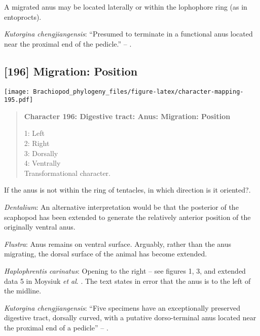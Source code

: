 \documentclass[openany]{book}
\theoremstyle{definition}
\theoremstyle{definition}
\theoremstyle{definition}
\theoremstyle{remark}
\begin{document}
A migrated anus may be located laterally or within the lophophore ring
(as in entoprocts).

\hypertarget{Kutorgina_chengjiangensis-coding-195}{}
\emph{Kutorgina chengjiangensis}: ``Presumed to terminate in a
functional anus located near the proximal end of the pedicle.'' --
\citet{Zhang2007Rhynchonelliformeanbrachiopods}.

\subsection*{{[}196{]} Migration: Position}\label{migration-position}

\texttt{[image: Brachiopod\_phylogeny\_files/figure-latex/character-mapping-195.pdf]}

\begin{quote}
\textbf{Character 196: Digestive tract: Anus: Migration: Position}

1: Left\\
2: Right\\
3: Dorsally\\
4: Ventrally\\
Transformational character.
\end{quote}

If the anus is not within the ring of tentacles, in which direction is
it oriented?.

\hypertarget{Dentalium-coding-196}{}
\emph{Dentalium}: An alternative interpretation would be that the
posterior of the scaphopod has been extended to generate the relatively
anterior position of the originally ventral anus.

\hypertarget{Flustra-coding-196}{}
\emph{Flustra}: Anus remains on ventral surface. Arguably, rather than
the anus migrating, the dorsal surface of the animal has become
extended.

\hypertarget{Haplophrentis_carinatus-coding-196}{}
\emph{Haplophrentis carinatus}: Opening to the right -- see figures 1,
3, and extended data 5 in Moysiuk \emph{et al}.
\citeyearpar{Moysiuk2017Hyolithsare}. The text states in error that the
anus is to the left of the midline.

\hypertarget{Kutorgina_chengjiangensis-coding-196}{}
\emph{Kutorgina chengjiangensis}: ``Five specimens have an exceptionally
preserved digestive tract, dorsally curved, with a putative
dorso-terminal anus located near the proximal end of a pedicle'' --
\citet{Zhang2007Rhynchonelliformeanbrachiopods}.
\end{document}
